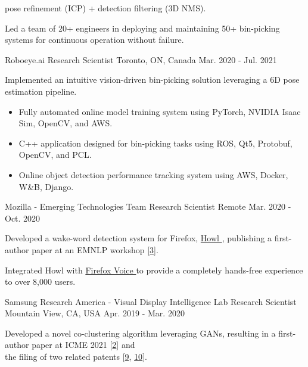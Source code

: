 \begin{cventries}
{\begin{cvitems}
\begin{itemize}[label=$\cdot$,leftmargin=0.7em]
{pose refinement (ICP) + detection filtering (3D NMS).}
\end{itemize}
\item {Led a team of 20+ engineers in deploying and maintaining 50+ bin-picking systems for continuous operation without failure.}
\end{cvitems}
}
\cventry
{Roboeye.ai} %
{Research Scientist} %
{Toronto, ON, Canada} %
{Mar. 2020 - Jul. 2021} %
{ %
\begin{cvitems}
\item {Implemented an intuitive vision-driven bin-picking solution leveraging a 6D pose estimation pipeline.}
\begin{itemize}[label=$\cdot$,leftmargin=0.7em]
\item {Fully automated online model training system using PyTorch, NVIDIA Isaac Sim, OpenCV, and AWS.}
\item {C++ application designed for bin-picking tasks using ROS, Qt5, Protobuf, OpenCV, and PCL.}
\item {Online object detection performance tracking system using AWS, Docker, W\&B, Django.}
\end{itemize}
\end{cvitems}
}
\cventry
{Mozilla - Emerging Technologies Team} %
{Research Scientist} %
{Remote} %
{Mar. 2020 - Oct. 2020} %
{ %
\begin{cvitems}
\item {Developed a wake-word detection system for Firefox, \href{https://github.com/castorini/howl}{Howl {\small \faGithub}}, publishing a first-author paper at an EMNLP workshop [\hyperlink{howl:EMNLP}{3}].}
\item {Integrated Howl with \href{https://github.com/mozilla-extensions/firefox-voice}{Firefox Voice {\small \faGithub}} to provide a completely hands-free experience to over 8,000 users.}
\end{cvitems}
}
\cventry
{Samsung Research America - Visual Display Intelligence Lab} %
{Research Scientist} %
{Mountain View, CA, USA} %
{Apr. 2019 - Mar. 2020} %
{ %
\begin{cvitems}
\item {Developed a novel co-clustering algorithm leveraging GANs, resulting in a first-author paper at ICME 2021 [\hyperlink{CI-GAN:ICME}{2}] and \\the filing of two related patents [\hyperlink{CI-GAN:International}{9}, \hyperlink{CI-GAN:US}{10}].}

\end{cvitems}}
\end{cventries}
